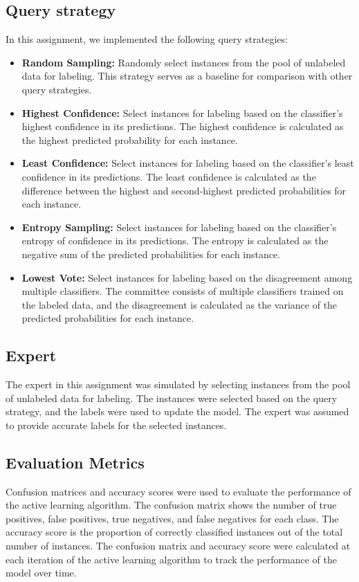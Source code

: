 \subsection{Query strategy}
In this assignment, we implemented the following query strategies:
\begin{itemize}
    \item \textbf{Random Sampling:} Randomly select instances from the pool of unlabeled data for labeling. This strategy serves as a baseline for comparison with other query strategies.
    \item \textbf{Highest Confidence:} Select instances for labeling based on the classifier's highest confidence in its predictions. The highest confidence is calculated as the highest predicted probability for each instance.
    \item \textbf{Least Confidence:} Select instances for labeling based on the classifier's least confidence in its predictions. The least confidence is calculated as the difference between the highest and second-highest predicted probabilities for each instance.    
    \item \textbf{Entropy Sampling:} Select instances for labeling based on the classifier's entropy of confidence in its predictions. The entropy is calculated as the negative sum of the predicted probabilities for each instance.
    \item \textbf{Lowest Vote:} Select instances for labeling based on the disagreement among multiple classifiers. The committee consists of multiple classifiers trained on the labeled data, and the disagreement is calculated as the variance of the predicted probabilities for each instance.
\end{itemize}

\subsection{Expert}
The expert in this assignment was simulated by selecting instances from the pool of unlabeled data for labeling. The instances were selected based on the query strategy, and the labels were used to update the model. The expert was assumed to provide accurate labels for the selected instances.


\subsection{Evaluation Metrics}
Confusion matrices and accuracy scores were used to evaluate the performance of the active learning algorithm. The confusion matrix shows the number of true positives, false positives, true negatives, and false negatives for each class.
The accuracy score is the proportion of correctly classified instances out of the total number of instances. The confusion matrix and accuracy score were calculated at each iteration of the active learning algorithm to track the performance of the model over time.